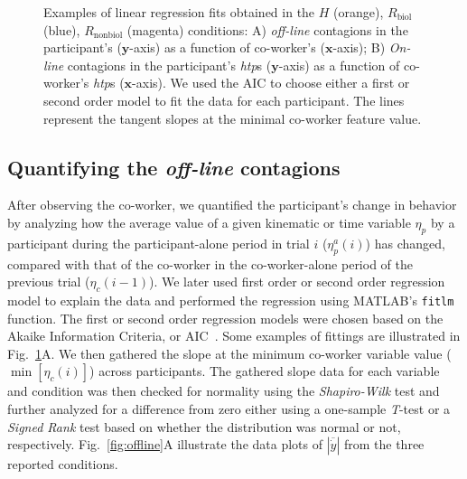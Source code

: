 \begin{figure}[t]
	\caption{Examples of linear regression fits obtained in the $\textit{H}$ (orange), $\textit{R}_{\text{biol}}$ (blue), $\textit{R}_{\text{nonbiol}}$ (magenta) conditions: A) \textit{off-line} contagions in the participant's  ($\textbf{y}$-axis) as a function of co-worker's  ($\textbf{x}$-axis); B) \textit{On-line} contagions in the participant's \textit{htp}s ($\textbf{y}$-axis) as a function of co-worker's \textit{htp}s ($\textbf{x}$-axis). We used the AIC to choose either a first or second order model to fit the data for each participant. The lines represent the tangent slopes at the minimal co-worker feature value.}
	\label{fig:fitting}
\end{figure}



\subsection{Quantifying the \textit{off-line} contagions}

After observing the co-worker, we quantified the participant's change in behavior by analyzing how the average value of a given kinematic or time variable $\eta_p$ by a participant during the participant-alone period in trial $i$ ($\eta_p^a (i)$) has changed, compared with that of the co-worker in the co-worker-alone period of the previous trial ($\eta_c(i-1)$). We later used first order or second order regression model to explain the data and performed the regression using MATLAB's  \texttt{fitlm} function. The first or second order regression models were chosen based on the Akaike Information Criteria, or AIC~\cite{Akaike:ISIT:1973}. Some examples of fittings are illustrated in Fig.~\ref{fig:fitting}A. We then gathered the slope at the minimum co-worker variable value ($\min[\eta_c(i)]$) across participants. The gathered slope data for each variable and condition was then checked for normality using the {\it Shapiro-Wilk} test and further analyzed for a difference from zero either using a one-sample {\it T}-test or a {\it Signed Rank} test based on whether the distribution was normal or not, respectively. Fig.~\ref{fig:offline}A illustrate the data plots of $|\overline{\dot{y}}|$ from the three reported conditions.

